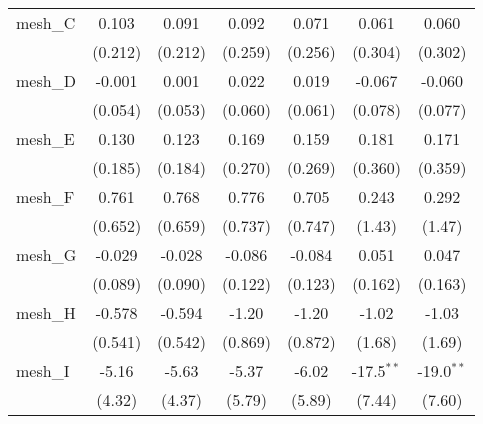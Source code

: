 \begin{tabular}{lcccccc}
   mesh\_C                                                     & 0.103         & 0.091        & 0.092         & 0.071         & 0.061         & 0.060\\   
                                                               & (0.212)       & (0.212)      & (0.259)       & (0.256)       & (0.304)       & (0.302)\\   
   mesh\_D                                                     & -0.001        & 0.001        & 0.022         & 0.019         & -0.067        & -0.060\\   
                                                               & (0.054)       & (0.053)      & (0.060)       & (0.061)       & (0.078)       & (0.077)\\   
   mesh\_E                                                     & 0.130         & 0.123        & 0.169         & 0.159         & 0.181         & 0.171\\   
                                                               & (0.185)       & (0.184)      & (0.270)       & (0.269)       & (0.360)       & (0.359)\\   
   mesh\_F                                                     & 0.761         & 0.768        & 0.776         & 0.705         & 0.243         & 0.292\\   
                                                               & (0.652)       & (0.659)      & (0.737)       & (0.747)       & (1.43)        & (1.47)\\   
   mesh\_G                                                     & -0.029        & -0.028       & -0.086        & -0.084        & 0.051         & 0.047\\   
                                                               & (0.089)       & (0.090)      & (0.122)       & (0.123)       & (0.162)       & (0.163)\\   
   mesh\_H                                                     & -0.578        & -0.594       & -1.20         & -1.20         & -1.02         & -1.03\\   
                                                               & (0.541)       & (0.542)      & (0.869)       & (0.872)       & (1.68)        & (1.69)\\   
   mesh\_I                                                     & -5.16         & -5.63        & -5.37         & -6.02         & -17.5$^{**}$  & -19.0$^{**}$\\   
                                                               & (4.32)        & (4.37)       & (5.79)        & (5.89)        & (7.44)        & (7.60)\\   

\end{tabular}
